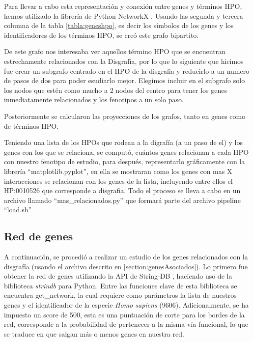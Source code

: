 Para llevar a cabo esta representación y conexión entre genes y términos HPO, hemos utilizado la librería de Python NetworkX \cite{BookNetworkX}. Usando las segunda y tercera columna de la tabla \ref{tabla:geneshpo}, es decir los símbolos de los genes y los identificadores de los términos HPO, se creó este grafo bipartito.

De este grafo nos interesaba ver aquellos término HPO que se encuentran estrechamente relacionados con la Disgrafía, por lo que lo siguiente que hicimos fue crear un subgrafo centrado en el HPO de la disgrafia y reducirlo a un numero de pasos de dos para poder esudiarlo mejor. Elegimos incluir en el subgrafo solo los nodos que estén como mucho a 2 nodos del centro para tener los genes inmediatamente relacionados y los fenotipos a un solo paso.

Posteriormente se calcularon las proyecciones de los grafos, tanto en genes como de términos HPO.

Teniendo una lista de los HPOs que rodean a la digrafía (a un paso de el) y los genes con los que se relaciona, se computó, cuántos genes relacionan a cada HPO con nuestro fenotipo de estudio, para después, representarlo gráficamente con la librería “matplotlib.pyplot”, en ella se mostraran como los genes con mas X interacciones se relacionan con los genes de la lista, incluyendo entre ellos el HP:0010526 que corresponde a disgrafia.
Todo el proceso se lleva a cabo en un archivo llamado “mas\_relacionados.py” que formará parte del archivo pipeline “load.sh”


\subsection{Red de genes}

A continuación, se procedió a realizar un estudio de los genes relacionados con la disgrafía (usando el archivo descrito en \ref{section:genesAsociados}). Lo primero fue obtener la red de genes utilizando la API de String-DB \cite{String2021}, haciendo uso de la biblioteca \textit{strindb} para Python. Entre las funciones clave de esta biblioteca se encuentra get\_network, la cual requiere como parámetros la lista de nuestros genes y el identificador de la especie \textit{Homo sapiens} (9606). Adicionalmente, se ha impuesto un score de 500, esta es una puntuación de corte para los bordes de la red, corresponde a la probabilidad de pertenecer a la misma vía funcional, lo que se traduce en que salgan más o menos genes en nuestra red.

